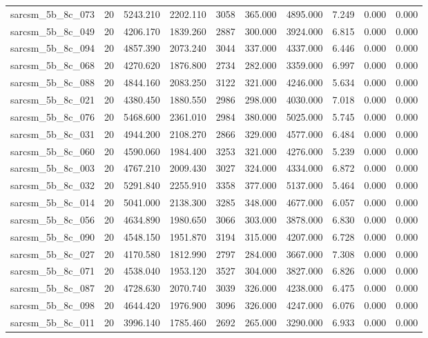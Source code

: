 \begin{tabular}{lrrrrrrrrr}
sarcsm\_5b\_8c\_073 & 20 & 5243.210 & 2202.110 & 3058 & 365.000 & 4895.000 & 7.249 & 0.000 & 0.000 \\
sarcsm\_5b\_8c\_049 & 20 & 4206.170 & 1839.260 & 2887 & 300.000 & 3924.000 & 6.815 & 0.000 & 0.000 \\
sarcsm\_5b\_8c\_094 & 20 & 4857.390 & 2073.240 & 3044 & 337.000 & 4337.000 & 6.446 & 0.000 & 0.000 \\
sarcsm\_5b\_8c\_068 & 20 & 4270.620 & 1876.800 & 2734 & 282.000 & 3359.000 & 6.997 & 0.000 & 0.000 \\
sarcsm\_5b\_8c\_088 & 20 & 4844.160 & 2083.250 & 3122 & 321.000 & 4246.000 & 5.634 & 0.000 & 0.000 \\
sarcsm\_5b\_8c\_021 & 20 & 4380.450 & 1880.550 & 2986 & 298.000 & 4030.000 & 7.018 & 0.000 & 0.000 \\
sarcsm\_5b\_8c\_076 & 20 & 5468.600 & 2361.010 & 2984 & 380.000 & 5025.000 & 5.745 & 0.000 & 0.000 \\
sarcsm\_5b\_8c\_031 & 20 & 4944.200 & 2108.270 & 2866 & 329.000 & 4577.000 & 6.484 & 0.000 & 0.000 \\
sarcsm\_5b\_8c\_060 & 20 & 4590.060 & 1984.400 & 3253 & 321.000 & 4276.000 & 5.239 & 0.000 & 0.000 \\
sarcsm\_5b\_8c\_003 & 20 & 4767.210 & 2009.430 & 3027 & 324.000 & 4334.000 & 6.872 & 0.000 & 0.000 \\
sarcsm\_5b\_8c\_032 & 20 & 5291.840 & 2255.910 & 3358 & 377.000 & 5137.000 & 5.464 & 0.000 & 0.000 \\
sarcsm\_5b\_8c\_014 & 20 & 5041.000 & 2138.300 & 3285 & 348.000 & 4677.000 & 6.057 & 0.000 & 0.000 \\
sarcsm\_5b\_8c\_056 & 20 & 4634.890 & 1980.650 & 3066 & 303.000 & 3878.000 & 6.830 & 0.000 & 0.000 \\
sarcsm\_5b\_8c\_090 & 20 & 4548.150 & 1951.870 & 3194 & 315.000 & 4207.000 & 6.728 & 0.000 & 0.000 \\
sarcsm\_5b\_8c\_027 & 20 & 4170.580 & 1812.990 & 2797 & 284.000 & 3667.000 & 7.308 & 0.000 & 0.000 \\
sarcsm\_5b\_8c\_071 & 20 & 4538.040 & 1953.120 & 3527 & 304.000 & 3827.000 & 6.826 & 0.000 & 0.000 \\
sarcsm\_5b\_8c\_087 & 20 & 4728.630 & 2070.740 & 3039 & 326.000 & 4238.000 & 6.475 & 0.000 & 0.000 \\
sarcsm\_5b\_8c\_098 & 20 & 4644.420 & 1976.900 & 3096 & 326.000 & 4247.000 & 6.076 & 0.000 & 0.000 \\
sarcsm\_5b\_8c\_011 & 20 & 3996.140 & 1785.460 & 2692 & 265.000 & 3290.000 & 6.933 & 0.000 & 0.000 \\

\end{tabular}
